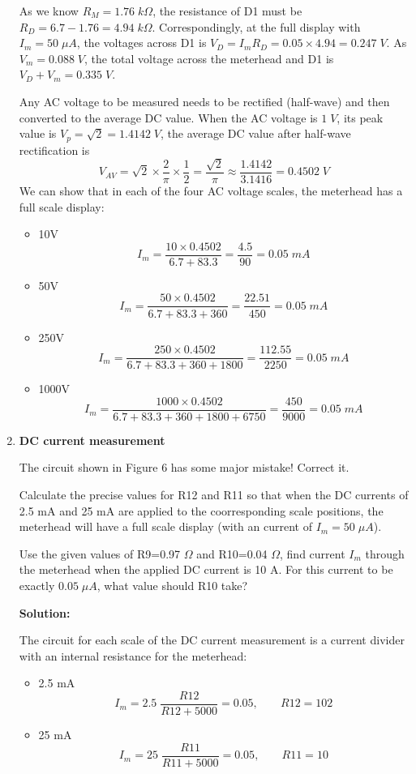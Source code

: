 \begin{enumerate}
  As we know $R_M=1.76\;k\Omega$, the resistance of D1 must be 
  $R_D=6.7-1.76=4.94\;k\Omega$. Correspondingly, at the full display with
  $I_m=50\;\mu A$, the voltages across D1 is
  $V_D=I_m R_D=0.05\times 4.94=0.247\;V$. As $V_m=0.088\;V$, the total
  voltage across the meterhead and D1 is $V_D+V_m=0.335\;V$.

  Any AC voltage to be measured needs to be rectified (half-wave) and then
  converted to the average DC value. When the AC voltage is $1\;V$, its
  peak value is $V_p=\sqrt{2}=1.4142\;V$, the average DC value after
  half-wave rectification is 
  \[
  V_{AV}=\sqrt{2}\times \frac{2}{\pi}\times\frac{1}{2}
  =\frac{\sqrt{2}}{\pi}\approx\frac{1.4142}{3.1416}=0.4502\;V
  \]
  We can show that in each of the four AC voltage scales, the meterhead
  has a full scale display:
  \begin{itemize}
  \item 10V
    \[
    I_m=\frac{10\times 0.4502}{6.7+83.3}=\frac{4.5}{90}=0.05\;mA
    \]
  \item 50V
    \[
    I_m=\frac{50\times 0.4502}{6.7+83.3+360}=\frac{22.51}{450}=0.05\;mA
    \]
  \item 250V
    \[
    I_m=\frac{250\times 0.4502}{6.7+83.3+360+1800}=\frac{112.55}{2250}=0.05\;mA
    \]
  \item 1000V
    \[
    I_m=\frac{1000\times 0.4502}{6.7+83.3+360+1800+6750}=\frac{450}{9000}=0.05\;mA
    \]
  \end{itemize}

\item {\bf DC current measurement}

  The circuit shown in Figure 6 has some major mistake! Correct it.

  Calculate the precise values for R12 and R11 so that when the DC currents
  of 2.5 mA and 25 mA are applied to the coorresponding scale positions, the 
  meterhead will have a full scale display (with an current of $I_m=50\;\mu A$).

  Use the given values of R9=0.97 $\Omega$ and R10=0.04 $\Omega$, find current
  $I_m$ through the meterhead when the applied DC current is 10 A. For this
  current to be exactly $0.05\;\mu A$, what value should R10 take?
  

  {\bf Solution:}

  The circuit for each scale of the DC current measurement is a current divider
  with an internal resistance for the meterhead:

  \begin{itemize}
  \item 2.5 mA
    \[
    I_m=2.5\;\frac{R12}{R12+5000}=0.05,\;\;\;\;\;\;\;R12=102
    \]
  \item 25 mA
    \[
    I_m=25\;\frac{R11}{R11+5000}=0.05,\;\;\;\;\;\;\;R11=10
    \]
  \end{itemize}
  

\end{enumerate}
